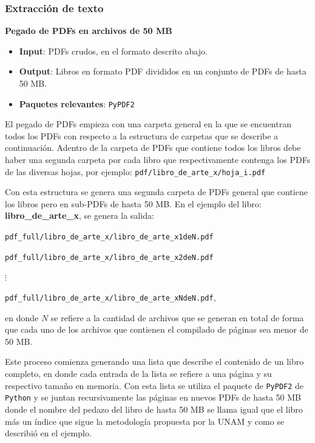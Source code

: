 \subsubsection{ Extracción de texto}

\textbf{ Pegado de PDFs en archivos de 50 MB}

\begin{itemize}
\item \textbf{Input}: PDFs crudos, en el formato descrito abajo.
\item \textbf{Output}: Libros en formato PDF divididos en un conjunto de PDFs de hasta 50 MB.
\item \textbf{Paquetes relevantes}: \texttt{PyPDF2}
\end{itemize}

El pegado de PDFs empieza con una carpeta general en la que se encuentran todos los PDFs con respecto a la estructura de carpetas que se describe a continuación. Adentro de la carpeta de PDFs que contiene todos los libros debe haber una segunda carpeta por cada libro que respectivamente contenga los PDFs de las diversas hojas, por ejemplo: \texttt{pdf/libro\_de\_arte\_x/hoja\_i.pdf}

Con esta estructura se genera una segunda carpeta de PDFs general que contiene los libros pero en sub-PDFs de hasta 50 MB. En el ejemplo del libro: \textbf{libro\_de\_arte\_x}, se genera la salida:

\texttt{pdf\_full/libro\_de\_arte\_x/libro\_de\_arte\_x1deN.pdf}

\texttt{pdf\_full/libro\_de\_arte\_x/libro\_de\_arte\_x2deN.pdf}

$\vdots$

\texttt{pdf\_full/libro\_de\_arte\_x/libro\_de\_arte\_xNdeN.pdf},

en donde $N$ se refiere a la cantidad de archivos que se generan en total de forma que cada uno de los archivos que contienen el compilado de páginas sea menor de 50 MB.

Este proceso comienza generando una lista que describe el contenido de un libro completo, en donde cada entrada de la lista se refiere a una página y su respectivo tamaño en memoria. Con esta lista se utiliza el paquete de   \texttt{PyPDF2} de \texttt{Python} y se juntan recursivamente las páginas en nuevos PDFs de hasta 50 MB donde el nombre del pedazo del libro de hasta 50 MB se llama igual que el libro más un índice que sigue la metodología propuesta por la UNAM y como se describió en el ejemplo.

